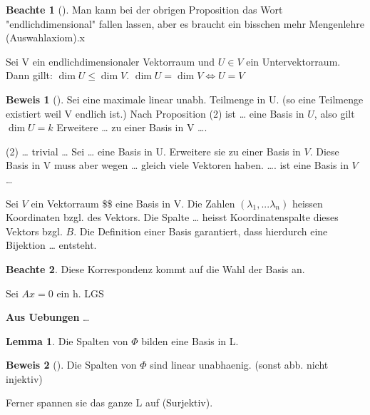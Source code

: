 \documentclass[fontsize=11pt,paper=a4,BCOR=0mm,DIV=11,automark,headsepline]{scrbook}
\theoremstyle{remark}
\theoremstyle{definition}
\newtheorem*{notte}{Beachte}
\newtheorem{lemma}{Lemma}[section]
\theoremstyle{proof}
\newtheorem*{prof}{Beweis}
\theoremstyle{remark}
\begin{document}
\begin{notte}[] \label{}
Man kann bei der obrigen Proposition das Wort "endlichdimensional" fallen
lassen, aber es braucht ein bisschen mehr Mengenlehre (Auswahlaxiom).x
\end{notte}


\begin{theo}{}{}
Sei V ein endlichdimensionaler Vektorraum und \(U\in V\) ein Untervektorraum. Dann
gillt: \(\dim U \leq \dim V\).  \(\dim U = \dim V \iff U=V\)
\end{theo}

\begin{prof}[] \label{}
Sei eine maximale linear unabh. Teilmenge in U. (so eine Teilmenge existiert
weil V endlich ist.)
Nach Proposition (2) ist \ldots{} eine Basis in \(U\), also gilt \(\dim U = k\) Erweitere
\ldots{} zu einer Basis in V \ldots{}. 

(2) \ldots{} trivial \ldots{} Sei \ldots{} eine Basis in U. Erweitere sie zu einer Basis in
\(V\). Diese Basis in V muss aber wegen \ldots{} gleich viele Vektoren haben. \ldots{}. ist
eine Basis in \(V\) \ldots{}
\end{prof}


\begin{definition}{}{}
Sei \(V\) ein Vektorraum \$\$ eine Basis in V. Die Zahlen \((\lambda_1,...\lambda_n)\)
heissen Koordinaten bzgl. des Vektors. Die Spalte \ldots{} heisst Koordinatenspalte
dieses Vektors bzgl. \(B\).
Die Definition einer Basis garantiert, dass hierdurch eine Bijektion \ldots{} entsteht.
\end{definition}

\begin{notte}
  Diese Korrespondenz kommt auf die Wahl der Basis an.
\end{notte}

\begin{exa} \label{}

\end{exa}

\begin{exa} \label{}
Sei \(Ax=0\) ein h. LGS
\end{exa}

\textbf{Aus Uebungen} \ldots{}

\begin{lemma}
  Die Spalten von \(\Phi\) bilden eine Basis in L.
\end{lemma}
  
\begin{prof}[] \label{}
Die Spalten von \(\Phi\) sind linear unabhaenig. (sonst abb. nicht injektiv)

Ferner spannen sie das ganze L auf (Surjektiv). 
\end{prof}
\end{document}
